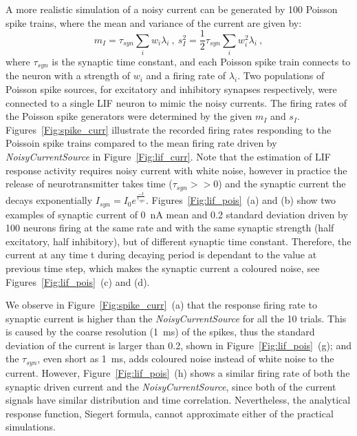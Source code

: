\documentclass[runningheads,a4paper]{llncs}
\begin{document}
A more realistic simulation of a noisy current can be generated by 100 Poisson spike trains, 
where the mean and variance of the current are given by:
\begin{equation}
m_I = \tau_{syn}\sum_i w_i\lambda_{i}~, ~s_I^2=\frac{1}{2}\tau_{syn}\sum_i w_i^2\lambda_{i}~,
\label{equ:distr}
\end{equation}
where $\tau_{syn}$ is the synaptic time constant, and each Poisson spike train connects to the neuron with a strength of $w_i$ and a firing rate of $\lambda_i$.
Two populations of Poisson spike sources, for excitatory and inhibitory synapses respectively, were connected to a single LIF neuron to mimic the noisy currents.
The firing rates of the Poisson spike generators were determined by the given $m_I$ and $s_I$.
Figures~\ref{Fig:spike_curr} illustrate the recorded firing rates responding to the Poissoin spike trains compared to the mean firing rate driven by \textit{NoisyCurrentSource} in Figure~\ref{Fig:lif_curr}.
Note that the estimation of LIF response activity requires noisy current with white noise, however
in practice the release of neurotransmitter takes time ($\tau_{syn} >> 0$) and the synaptic current the decays exponentially $I_{syn} = I_0 e^{\frac{-t}{\tau_{syn}}}$.
Figures~\ref{Fig:lif_pois}~(a) and (b) show two examples of synaptic current of 0~nA mean and 0.2 standard deviation driven by 100 neurons firing at the same rate and with the same synaptic strength (half excitatory, half inhibitory), but of different synaptic time constant.
Therefore, the current at any time t during decaying period is dependant to the value at previous time step, which makes the synaptic current a coloured noise, see Figures~\ref{Fig:lif_pois}~(c) and (d).

We observe in Figure~\ref{Fig:spike_curr}~(a) that the response firing rate to synaptic current is higher than the \textit{NoisyCurrentSource} for all the 10 trials.
This is caused by the coarse resolution (1~ms) of the spikes, thus the standard deviation of the current is larger than 0.2, shown in Figure~\ref{Fig:lif_pois}~(g);
and the $\tau_{syn}$, even short as 1~ms, adds coloured noise instead of white noise to the current.
However, Figure~\ref{Fig:lif_pois}~(h) shows a similar firing rate of both the synaptic driven current and the \textit{NoisyCurrentSource}, since both of the current signals have similar distribution and time correlation.
Nevertheless, the analytical response function, Siegert formula, cannot approximate either of the practical simulations.
\end{document}

